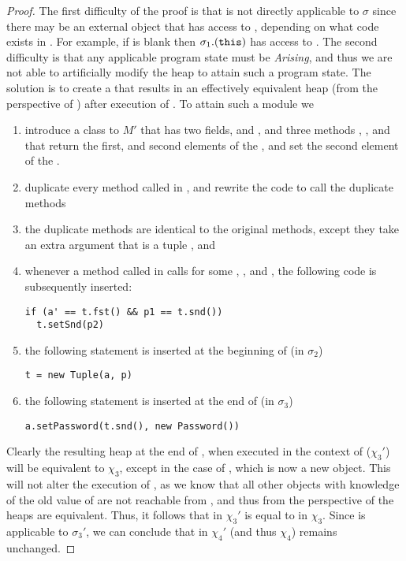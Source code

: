 \begin{proof}
The first difficulty of the proof is that \SrobustB is not directly applicable to $\sigma$ since there may be an external 
object that has access to , depending on what code exists in . For example, if  
is blank then $\sigma_1.({\texttt{this}})$ has access to . The second difficulty is that any applicable program state must be 
\textit{Arising}, and thus we are not able to artificially modify the heap to attain such a program state. The solution is 
to create a  that results in an effectively equivalent heap (from the perspective of ) after execution of . To attain such a module we
\begin{enumerate}
\item
introduce a class  to $M'$ that has two fields,  and , and three methods , , and  that 
return the first, and second elements of the , and set the second element of the .
\item
duplicate every method called in , and rewrite the code to call the duplicate methods
\item
the duplicate methods are identical to the original methods, except they take an extra argument that is a tuple , and
\item
whenever a method called in  calls  for some 
, , and , the following code is subsequently inserted:
\begin{lstlisting}[mathescape=true, language=chainmail, frame=lines]
if (a' == t.fst() && p1 == t.snd())
  t.setSnd(p2)
\end{lstlisting}
\item
the following statement is inserted at the beginning of  (in $\sigma_2$)
\begin{lstlisting}[mathescape=true, language=chainmail, frame=lines]
t = new Tuple(a, p)
\end{lstlisting}
\item
the following statement is inserted at the end of  (in $\sigma_3$)
\begin{lstlisting}[mathescape=true, language=chainmail, frame=lines]
a.setPassword(t.snd(), new Password())
\end{lstlisting}
\end{enumerate}
Clearly the resulting heap at the end of , when executed in the context of  ($\chi_3'$)
will be equivalent to $\chi_3$, except in the case of , which is now a new object.
This will not alter the execution of , as we know that all other objects with knowledge of the old value of  are not reachable from ,
and thus from the perspective of  the heaps are equivalent.
Thus, it follows that  in $\chi_3'$ is equal to  in $\chi_3$.
Since \SrobustB is applicable to $\sigma_3'$, we can conclude that  in $\chi_4'$ (and thus $\chi_4$)
remains unchanged.
\end{proof}




